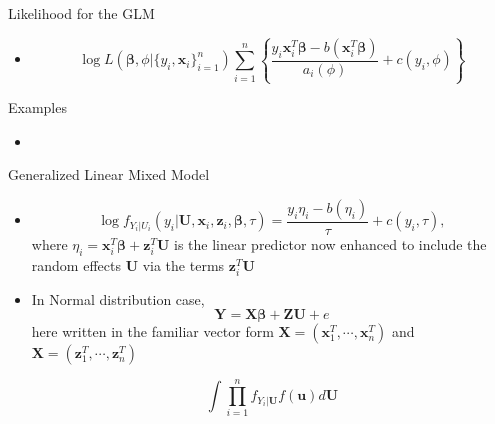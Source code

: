 \documentclass{beamer}
\begin{document}
        
        \begin{frame}{Likelihood for the GLM}
        \begin{itemize}
            \item 
            $$\log L(\boldsymbol{\beta}, \phi|\{y_{i}, \mathbf{x}_{i}\}^{n}_{i=1}) \sum^{n}_{i=1}\left\{\frac{y_{i}\mathbf{x}^{T}_{i}\boldsymbol{\beta} - b(\mathbf{x}^{T}_{i}\boldsymbol{\beta})}{a_{i}(\phi)} + c(y_{i}, \phi)\right\}$$
            
        \end{itemize} 
        \end{frame}
        
        \begin{frame}{Examples}
        \begin{itemize}
            \item 
        \end{itemize} 
        \end{frame}


        
        \begin{frame}{Generalized Linear Mixed Model}
        \begin{itemize}
            \item
            
            $$\log f_{Y_{i}|U_{i}}(y_{i}|\mathbf{U}, \mathbf{x}_{i}, \mathbf{z}_{i}, \boldsymbol{\beta}, \tau) = \frac{y_{i}\eta_{i}-b(\eta_{i})}{\tau} + c(y_{i}, \tau),$$
            where $\eta_{i} = \mathbf{x}^{T}_{i}\boldsymbol{\beta} + \mathbf{z}^{T}_{i}\mathbf{U}$ is the linear predictor now enhanced to include the random effects $\mathbf{U}$ via the terms $\mathbf{z}^{T}_{i}\mathbf{U}$
            \item In Normal distribution case, $$\mathbf{Y} = \mathbf{X}\boldsymbol{\beta} + \mathbf{Z}\mathbf{U} + e$$
            here written in the familiar vector form $\mathbf{X} = (\mathbf{x}^{T}_{1}, \cdots, \mathbf{x}^{T}_{n})$ and $\mathbf{X} = (\mathbf{z}^{T}_{1}, \cdots, \mathbf{z}^{T}_{n})$
            
            $$\int \prod^{n}_{i=1} f_{Y_{i}|\mathbf{U}}f(\mathbf{u})d\mathbf{U}$$
        \end{itemize} 
        \end{frame}
\end{document}
